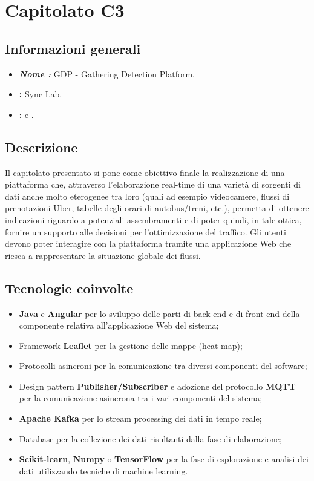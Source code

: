 \section{Capitolato C3}

\subsection{Informazioni generali}{
\begin{itemize}
\item \textbf{\emph{Nome :}} GDP - Gathering Detection Platform.
\item \textbf{\commitProg:} Sync Lab.
\item \textbf{\proponProg:} \VT{} e \CR.
\end{itemize}
}

\subsection{Descrizione}{
Il capitolato presentato si pone come obiettivo finale la realizzazione di una piattaforma che, attraverso l'elaborazione real-time di una varietà di sorgenti di dati anche molto eterogenee tra loro (quali ad esempio videocamere, flussi di prenotazioni Uber, tabelle degli orari di autobus/treni, etc.), permetta di ottenere indicazioni riguardo a potenziali assembramenti e di poter quindi, in tale ottica, fornire un supporto alle decisioni per l'ottimizzazione del traffico.
Gli utenti devono poter interagire con la piattaforma tramite una applicazione Web che riesca a rappresentare la situazione globale dei flussi.
}

\subsection{Tecnologie coinvolte}{
\begin{itemize}
\item \textbf{Java} e \textbf{Angular} per lo sviluppo delle parti di back-end e di front-end della componente relativa all'applicazione Web del sistema; 
\item Framework \textbf{Leaflet} per la gestione delle mappe (heat-map);
\item Protocolli asincroni per la comunicazione tra diversi componenti del software;
\item Design pattern \textbf{Publisher/Subscriber} e adozione del protocollo \textbf{MQTT} per la comunicazione asincrona tra i vari componenti del sistema;
\item \textbf{Apache Kafka} per lo stream processing dei dati in tempo reale;
\item Database per la collezione dei dati risultanti dalla fase di elaborazione;
\item \textbf{Scikit-learn}, \textbf{Numpy} o \textbf{TensorFlow} per la fase di esplorazione e analisi dei dati utilizzando tecniche di machine learning.
\end{itemize}
}

